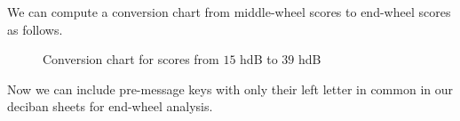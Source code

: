   \noindent We can compute a conversion chart from middle-wheel
  scores to end-wheel scores as follows.
  \begin{figure}[H]
    \begin{center}
    \end{center}
    \caption{Conversion chart for scores from $15$ hdB to $39$ hdB}
  \end{figure}
  \noindent Now we can include pre-message keys with only their left
  letter in common in our deciban sheets for end-wheel analysis.
